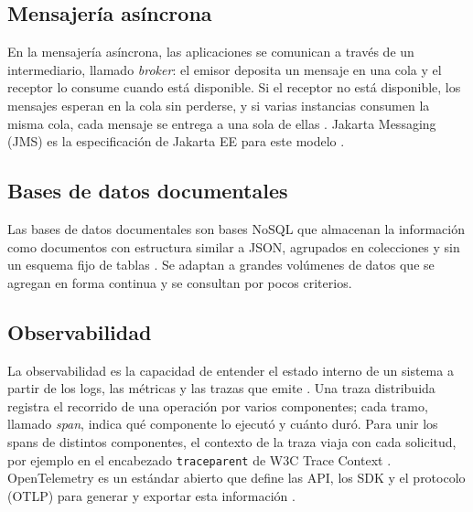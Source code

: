 \subsection{Mensajería asíncrona}
En la mensajería asíncrona, las aplicaciones se comunican a través de un intermediario, llamado \textit{broker}: el emisor deposita un mensaje en una cola y el receptor lo consume cuando está disponible. Si el receptor no está disponible, los mensajes esperan en la cola sin perderse, y si varias instancias consumen la misma cola, cada mensaje se entrega a una sola de ellas \cite{Hohpe2003}. Jakarta Messaging (JMS) es la especificación de Jakarta EE para este modelo \cite{JakartaMessaging}.

\subsection{Bases de datos documentales}
Las bases de datos documentales son bases NoSQL que almacenan la información como documentos con estructura similar a JSON, agrupados en colecciones y sin un esquema fijo de tablas \cite{MongoDBDocuments}. Se adaptan a grandes volúmenes de datos que se agregan en forma continua y se consultan por pocos criterios.

\subsection{Observabilidad}
La observabilidad es la capacidad de entender el estado interno de un sistema a partir de los logs, las métricas y las trazas que emite \cite{OTelObservability}. Una traza distribuida registra el recorrido de una operación por varios componentes; cada tramo, llamado \textit{span}, indica qué componente lo ejecutó y cuánto duró. Para unir los spans de distintos componentes, el contexto de la traza viaja con cada solicitud, por ejemplo en el encabezado \texttt{traceparent} de W3C Trace Context \cite{W3CTraceContext}. OpenTelemetry es un estándar abierto que define las API, los SDK y el protocolo (OTLP) para generar y exportar esta información \cite{OTelObservability}.
